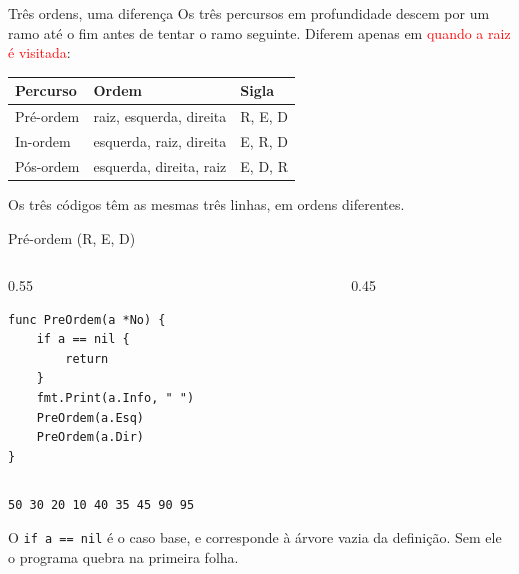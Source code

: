 \documentclass{beamer}
\newcommand{\tcr}[1]{\textcolor{red}{#1}}
\begin{document}
\begin{frame}{Três ordens, uma diferença}
  Os três percursos em profundidade descem por um ramo até o fim antes de tentar
  o ramo seguinte. Diferem apenas em \tcr{quando a raiz é visitada}:

  \vspace{0.5cm}
  \begin{center}
    \begin{tabular}{lll}
      \toprule
      \textbf{Percurso} & \textbf{Ordem}           & \textbf{Sigla} \\
      \midrule
      Pré-ordem         & raiz, esquerda, direita  & R, E, D        \\
      In-ordem          & esquerda, raiz, direita  & E, R, D        \\
      Pós-ordem         & esquerda, direita, raiz  & E, D, R        \\
      \bottomrule
    \end{tabular}
  \end{center}

  \vspace{0.5cm}
  Os três códigos têm as mesmas três linhas, em ordens diferentes.
\end{frame}

\begin{frame}[fragile]{Pré-ordem (R, E, D)}
  \begin{columns}
    \begin{column}{0.55\textwidth}
      \begin{verbatim}
func PreOrdem(a *No) {
    if a == nil {
        return
    }
    fmt.Print(a.Info, " ")
    PreOrdem(a.Esq)
    PreOrdem(a.Dir)
}
      \end{verbatim}
    \end{column}
    \begin{column}{0.45\textwidth}
      \centering
    \end{column}
  \end{columns}

  \vspace{0.3cm}
  \texttt{50 30 20 10 40 35 45 90 95}

  \footnotesize O \texttt{if a == nil} é o caso base, e corresponde à árvore
  vazia da definição. Sem ele o programa quebra na primeira folha.
\end{frame}
\end{document}
